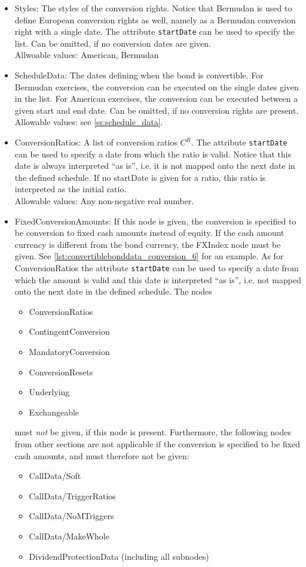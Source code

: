 \begin{itemize}

\item Styles: The styles of the conversion rights. Notice that Bermudan is used to define European conversion rights as
  well, namely as a Bermudan conversion right with a single date. The attribute \verb+startDate+ can be used to
  specify the list. Can be omitted, if no conversion dates are given.\\
  Allwoable values: American, Bermudan

\item ScheduleData: The dates defining when the bond is convertible. For Bermudan exercises, the conversion can be
  executed on the single dates given in the list. For American exercises, the conversion can be executed between a given
  start and end date. Can be omitted, if no conversion rights are present.\\
  Allowable values: see \ref{ss:schedule_data}.

\item ConversionRatios: A list of conversion ratios $C^R$. The attribute \verb+startDate+ can be used to specify a date
  from which the ratio is valid. Notice that this date is always interpreted ``as is'', i.e. it is not mapped onto the
  next date in the defined schedule. If no startDate is given for a ratio, this ratio is interpreted as the initial
  ratio. \\
  Allowable values: Any non-negative real number.

\item FixedConversionAmounts: If this node is given, the conversion is specified to be conversion to fixed cash amounts
  instead of equity. If the cash amount currency is different from the bond currency, the FXIndex node must be
  given. See \ref{lst:convertiblebonddata_conversion_6} for an example. As for ConversionRatios the attribute
  \verb+startDate+ can be used to specify a date from which the amount is valid and this date is interpreted ``as is'',
  i.e. not mapped onto the next date in the defined schedule. The nodes
\begin{itemize}
  \item ConversionRatios
  \item ContingentConversion
  \item MandatoryConversion
  \item ConversionResets
  \item Underlying
  \item Exchangeable
\end{itemize}
must {\em not} be given, if this node is present. Furthermore, the following nodes from other sections are not
applicable if the conversion is specified to be fixed cash amounts, and must therefore not be given:
\begin{itemize}
\item CallData/Soft
\item CallData/TriggerRatios
\item CallData/NoMTriggers
\item CallData/MakeWhole
\item DividendProtectionData (including all subnodes)
\end{itemize}


\end{itemize}

